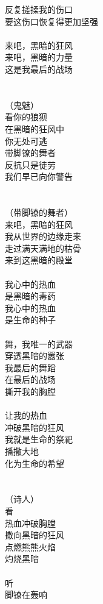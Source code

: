 反复搓揉我的伤口\\
要这伤口恢复得更加坚强\\
\\
来吧，黑暗的狂风\\
来吧，黑暗的力量\\
这是我最后的战场\\
\\
\\
（鬼魅）\\
看你的狼狈\\
在黑暗的狂风中\\
你无处可逃\\
带脚镣的舞者\\
反抗只是徒劳\\
我们早已向你警告\\
\\
\\
（带脚镣的舞者）\\
来吧，黑暗的狂风\\
我从世界的边缘走来\\
走过满天满地的枯骨\\
来到这黑暗的殿堂\\
\\
我心中的热血\\
是黑暗的毒药\\
我心中的热血\\
是生命的种子\\
\\
舞，我唯一的武器\\
穿透黑暗的嚣张\\
我最后的舞蹈\\
在最后的战场\\
撕开我的胸膛\\
\\
让我的热血\\
冲破黑暗的狂风\\
我就是生命的祭祀\\
播撒大地\\
化为生命的希望\\
\\
\\
（诗人）\\
看\\
热血冲破胸膛\\
撒向黑暗的狂风\\
点燃熊熊火焰\\
灼烧黑暗\\
\\
听\\
脚镣在轰响\\
